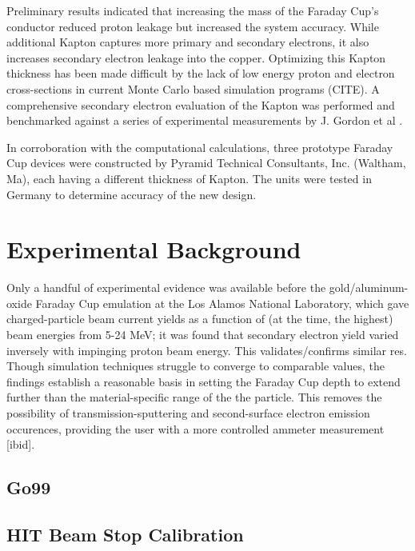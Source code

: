 \documentclass{mc2015}
\begin{document}
Preliminary results indicated that increasing the mass of the Faraday Cup’s conductor reduced proton leakage but increased the system accuracy. While additional Kapton captures more primary and secondary electrons, it also increases secondary electron leakage into the copper. Optimizing this Kapton thickness has been made difficult by the lack of low energy proton and electron cross-sections in current Monte Carlo based simulation programs (CITE). A comprehensive secondary electron evaluation of the Kapton was performed and benchmarked against a series of experimental measurements by J. Gordon et al \cite{PTC-HIT}.

In corroboration with the computational calculations, three prototype Faraday Cup devices were constructed by Pyramid Technical Consultants, Inc. (Waltham, Ma), each having a different thickness of Kapton. The units were tested in Germany to determine accuracy of the new design.


\section{Experimental Background}

Only a handful of experimental evidence was available before the gold/aluminum-oxide Faraday Cup emulation at the Los Alamos National Laboratory, which gave charged-particle beam current yields as a function of (at the time, the highest) beam energies from 5-24 MeV; it was found that secondary electron yield varied inversely with impinging proton beam energy\cite{bo88}.  This validates/confirms similar res.  Though simulation techniques struggle to converge to comparable values, the findings establish a reasonable basis in setting the Faraday Cup depth to extend further than the material-specific range of the the particle.  This removes the possibility of transmission-sputtering and second-surface electron emission occurences, providing the user with a more controlled ammeter measurement [ibid].

\subsection{Go99}


\subsection{HIT Beam Stop Calibration}
\end{document}
